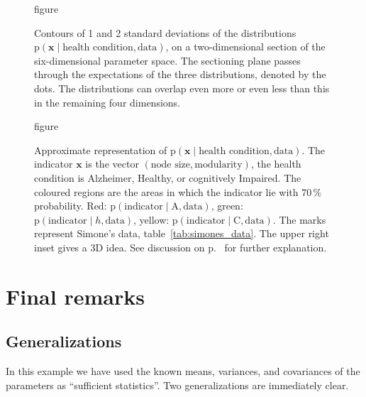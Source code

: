 \documentclass[\ifafour a4paper,12pt,\else a5paper,10pt,\fi%
onecolumn,oneside,article,%
british%
]{memoir}
\theoremstyle{remark}
\theoremstyle{innote}
\newcommand*{\pf}{\mathrm{p}}%
\renewcommand*{\|}{\mathpunct{|}}
\newcommand*{\fig}{fig.}%
\newcommand*{\yh}{h}
\newcommand*{\yx}{x}
\newcommand*{\yxx}{\bm{\yx}}
\newcommand*{\data}{\text{data}}
\newcommand*{\ya}{\mathrm{A}}
\newcommand*{\yi}{\mathrm{C}}
\theoremstyle{plain}
\begin{document}
\begin{figure}[!h]
  \centering
figure%
\caption{Contours of 1 and 2 standard deviations of the distributions
  $\pf(\yxx \| \text{health condition}, \data)$, on a two-dimensional
  section of the six-dimensional parameter space. The sectioning plane
  passes through the expectations of the three distributions, denoted by
  the dots. The distributions can overlap even more or even less than this
  in the remaining four dimensions.}
\label{results_regions}
\end{figure}

\begin{figure}[!h]
  \centering
figure%
\caption{Approximate representation of
  $\pf(\yxx \| \text{health condition},
  \data)$. The indicator $\yxx$ is the vector
  $(\text{node size},\text{modularity})$, the health condition is
  Alzheimer, Healthy, or cognitively Impaired. The coloured regions are the
  areas in which the indicator lie with $70\,\%$ probability. Red:
  $\pf(\text{indicator} \| \ya, \data)$, green:
  $\pf(\text{indicator} \|\yh, \data)$, yellow:
  $\pf(\text{indicator} \| \yi, \data)$. The marks represent Simone's
  data, table~\ref{tab:simones_data}. The upper right inset gives a 3D
  idea. See discussion on p.~\pageref{eq:results_discussion} for further
  explanation.}
\label{results_regions_old}
\end{figure}

\clearpage

\section{Final remarks}
\label{sec:remarks}

\subsection{Generalizations}
\label{sec:generalizations}

In this example we have used the known means, variances, and covariances of
the parameters as \enquote{sufficient statistics}. Two generalizations
are immediately clear.

\end{document}
